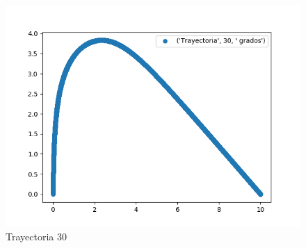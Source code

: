 \documentclass{article}
\begin{document}
\begin{figure}
  \centering
    \includegraphics{('Trayectoria', 30, ' grados').png}
  \caption{Trayectoria 30}
  \label{fig:ejemplo1}
\end{figure}
\end{document}
